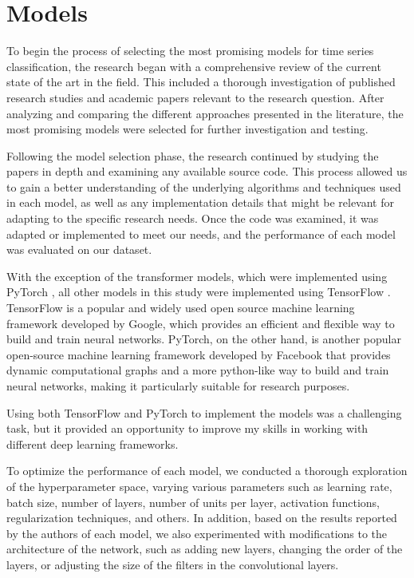 \section{Models}
To begin the process of selecting the most promising models for time series classification, the research began with a comprehensive review of the current state of the art in the field. This included a thorough investigation of published research studies and academic papers relevant to the research question. 
After analyzing and comparing the different approaches presented in the literature, the most promising models were selected for further investigation and testing.

Following the model selection phase, the research continued by studying the papers in depth and examining any available source code.
This process allowed us to gain a better understanding of the underlying algorithms and techniques used in each model, as well as any implementation details that might be relevant for adapting to the specific research needs.
Once the code was examined, it was adapted or implemented to meet our needs, and the performance of each model was evaluated on our dataset.

With the exception of the transformer models, which were implemented using PyTorch \cite{NEURIPS2019_9015}, all other models in this study were implemented using TensorFlow \cite{tensorflow2015-whitepaper}.
TensorFlow is a popular and widely used open source machine learning framework developed by Google, which provides an efficient and flexible way to build and train neural networks.
PyTorch, on the other hand, is another popular open-source machine learning framework developed by Facebook that provides dynamic computational graphs and a more python-like way to build and train neural networks, making it particularly suitable for research purposes.

Using both TensorFlow and PyTorch to implement the models was a challenging task, but it provided an opportunity to improve my skills in working with different deep learning frameworks.

To optimize the performance of each model, we conducted a thorough exploration of the hyperparameter space, varying various parameters such as learning rate, batch size, number of layers, number of units per layer, activation functions, regularization techniques, and others.
In addition, based on the results reported by the authors of each model, we also experimented with modifications to the architecture of the network, such as adding new layers, changing the order of the layers, or adjusting the size of the filters in the convolutional layers.

